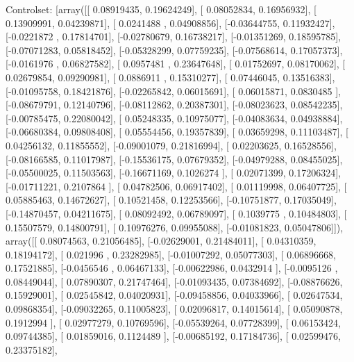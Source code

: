\documentclass{article}
\begin{document}
Controlset: [array([[ 0.08919435,  0.19624249],
       [ 0.08052834,  0.16956932],
       [ 0.13909991,  0.04239871],
       [ 0.0241488 ,  0.04908856],
       [-0.03644755,  0.11932427],
       [-0.0221872 ,  0.17814701],
       [-0.02780679,  0.16738217],
       [-0.01351269,  0.18595785],
       [-0.07071283,  0.05818452],
       [-0.05328299,  0.07759235],
       [-0.07568614,  0.17057373],
       [-0.0161976 ,  0.06827582],
       [ 0.0957481 ,  0.23647648],
       [ 0.01752697,  0.08170062],
       [ 0.02679854,  0.09290981],
       [ 0.0886911 ,  0.15310277],
       [ 0.07446045,  0.13516383],
       [-0.01095758,  0.18421876],
       [-0.02265842,  0.06015691],
       [ 0.06015871,  0.0830485 ],
       [-0.08679791,  0.12140796],
       [-0.08112862,  0.20387301],
       [-0.08023623,  0.08542235],
       [-0.00785475,  0.22080042],
       [ 0.05248335,  0.10975077],
       [-0.04083634,  0.04938884],
       [-0.06680384,  0.09808408],
       [ 0.05554456,  0.19357839],
       [ 0.03659298,  0.11103487],
       [ 0.04256132,  0.11855552],
       [-0.09001079,  0.21816994],
       [ 0.02203625,  0.16528556],
       [-0.08166585,  0.11017987],
       [-0.15536175,  0.07679352],
       [-0.04979288,  0.08455025],
       [-0.05500025,  0.11503563],
       [-0.16671169,  0.1026274 ],
       [ 0.02071399,  0.17206324],
       [-0.01711221,  0.2107864 ],
       [ 0.04782506,  0.06917402],
       [ 0.01119998,  0.06407725],
       [ 0.05885463,  0.14672627],
       [ 0.10521458,  0.12253566],
       [-0.10751877,  0.17035049],
       [-0.14870457,  0.04211675],
       [ 0.08092492,  0.06789097],
       [ 0.1039775 ,  0.10484803],
       [ 0.15507579,  0.14800791],
       [ 0.10976276,  0.09955088],
       [-0.01081823,  0.05047806]]), array([[ 0.08074563,  0.21056485],
       [-0.02629001,  0.21484011],
       [ 0.04310359,  0.18194172],
       [ 0.021996  ,  0.23282985],
       [-0.01007292,  0.05077303],
       [ 0.06896668,  0.17521885],
       [-0.0456546 ,  0.06467133],
       [-0.00622986,  0.0432914 ],
       [-0.0095126 ,  0.08449044],
       [ 0.07890307,  0.21747464],
       [-0.01093435,  0.07384692],
       [-0.08876626,  0.15929001],
       [ 0.02545842,  0.04020931],
       [-0.09458856,  0.04033966],
       [ 0.02647534,  0.09868354],
       [-0.09032265,  0.11005823],
       [ 0.02096817,  0.14015614],
       [ 0.05090878,  0.1912994 ],
       [ 0.02977279,  0.10769596],
       [-0.05539264,  0.07728399],
       [ 0.06153424,  0.09744385],
       [ 0.01859016,  0.1124489 ],
       [-0.00685192,  0.17184736],
       [ 0.02599476,  0.23375182],
\end{document}
